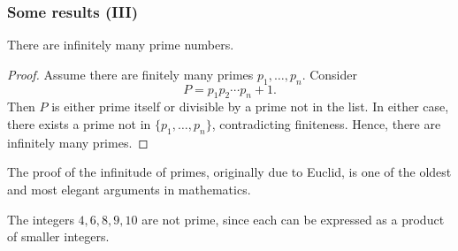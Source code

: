 \begin{frame}
\frametitle{Some results (III)}
\begin{proposition}
There are infinitely many prime numbers.
\end{proposition}

\begin{proof}
Assume there are finitely many primes \(p_1,\dots,p_n\). Consider
\[
P = p_1 p_2 \cdots p_n + 1.
\]
Then \(P\) is either prime itself or divisible by a prime not in the list. In either case, there exists a prime not in \(\{p_1,\dots,p_n\}\), contradicting finiteness. Hence, there are infinitely many primes.
\end{proof}

\begin{remark}[Euclid]
The proof of the infinitude of primes, originally due to Euclid, is one of the oldest and most elegant arguments in mathematics.
\end{remark}

\begin{example}
The integers $4, 6, 8, 9, 10$ are not prime, since each can be expressed as a product of smaller integers.
\end{example}
\end{frame}
